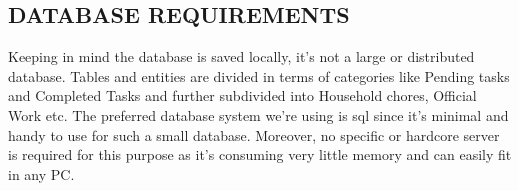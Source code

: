 \documentclass[12pt, a4paper]{report}
\begin{document}
\begin{enumerate}
\chapter{DATABASE REQUIREMENTS   }
Keeping in mind the database is saved locally, it’s not a large or distributed database. Tables and entities are divided in terms of categories like Pending tasks and Completed Tasks and further subdivided into Household chores, Official Work etc. 
The preferred database system we’re using is sql since it’s minimal and handy to use for such a small database. Moreover, no specific or hardcore server is required for this purpose as it’s consuming very little memory and can easily fit in any PC.

\end{enumerate}
\newpage


\printindex
\end{document}
